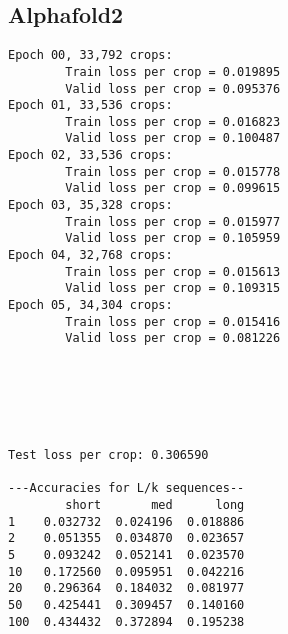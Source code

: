 \documentclass[11pt]{article}
\begin{document}
\subsection{Alphafold2}
\begin{lstlisting}
Epoch 00, 33,792 crops:
        Train loss per crop = 0.019895
        Valid loss per crop = 0.095376
Epoch 01, 33,536 crops:
        Train loss per crop = 0.016823
        Valid loss per crop = 0.100487
Epoch 02, 33,536 crops:
        Train loss per crop = 0.015778
        Valid loss per crop = 0.099615
Epoch 03, 35,328 crops:
        Train loss per crop = 0.015977
        Valid loss per crop = 0.105959
Epoch 04, 32,768 crops:
        Train loss per crop = 0.015613
        Valid loss per crop = 0.109315
Epoch 05, 34,304 crops:
        Train loss per crop = 0.015416
        Valid loss per crop = 0.081226






Test loss per crop: 0.306590

---Accuracies for L/k sequences--
        short       med      long
1    0.032732  0.024196  0.018886
2    0.051355  0.034870  0.023657
5    0.093242  0.052141  0.023570
10   0.172560  0.095951  0.042216
20   0.296364  0.184032  0.081977
50   0.425441  0.309457  0.140160
100  0.434432  0.372894  0.195238
\end{lstlisting}
\end{document}

